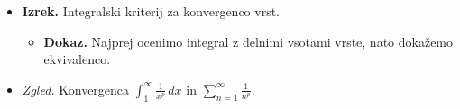\begin{enumerate}
\begin{itemize}
        (2) Eulerjeva funkcija $\Gamma(s) = \int_{0}^{\infty}x^{s-1}e^{-x} \, dx$. Določi definicijsko območje. Dokaži, da $\Gamma(n+1) = n!$ za vse $n \in \NN$.
        \item \colorbox{blue!30}{\textbf{Izrek.}} Integralski kriterij za konvergenco vrst.
        \begin{itemize}
            \item \colorbox{green!30}{\textbf{Dokaz.}} Najprej ocenimo integral z delnimi vsotami vrste, nato dokažemo ekvivalenco.
        \end{itemize}
        \item \colorbox{yellow!30}{\emph{Zgled.}} Konvergenca $\displaystyle \int_{1}^{\infty} \frac{1}{x^p}  \,dx $ in $\displaystyle \sum_{n=1}^{\infty} \frac{1}{n^p}$.
    \end{itemize}
\end{enumerate}

